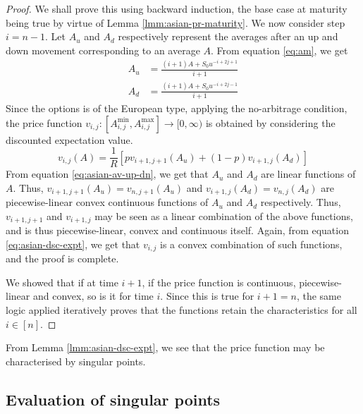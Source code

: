 \begin{proof}
	We shall prove this using backward induction, the base case at maturity being true by virtue of Lemma \ref{lmm:asian-pr-maturity}.
	We now consider step $ i = n-1 $. Let $A_u$ and $A_d$ respectively represent the averages after an up and down movement corresponding to an average $A$. From equation \ref{eq:am}, we get
	\begin{subequations}
		\label{eq:asian-av-up-dn}
		\begin{align}
			A_u &= \frac{ (i+1) A + S_0 u^{-i+2j+1} }{ i+1 } \\
			A_d &= \frac{ (i+1) A + S_0 u^{-i+2j-1} }{ i+1 }
		\end{align}
	\end{subequations}
	Since the options is of the European type, applying the no-arbitrage condition, the price function $ v_{i,j}: \left[ A_{i,j}^{\min}, A_{i,j}^{\max} \right] \to [0, \infty) $ is obtained by considering the discounted expectation value.
	\begin{equation}
		\label{eq:asian-dsc-expt}
		v_{i,j}(A) = \frac{1}{R} \left[ p v_{i+1,j+1}(A_u) + (1 - p) v_{i+1,j}(A_d) \right]
	\end{equation}
	From equation \ref{eq:asian-av-up-dn}, we get that $A_u$ and $A_d$ are linear functions of $A$. Thus, $ v_{i+1,j+1}(A_u) = v_{n,j+1}(A_u)$ and $ v_{i+1,j}(A_d) = v_{n,j}(A_d) $ are piecewise-linear convex continuous functions of $A_u$ and $A_d$ respectively. Thus, $ v_{i+1,j+1} $ and $ v_{i+1,j} $ may be seen as a linear combination of the above functions, and is thus piecewise-linear, convex and continuous itself. Again, from equation \ref{eq:asian-dsc-expt}, we get that $v_{i,j}$ is a convex combination of such functions, and the proof is complete.
	
	We showed that if at time $ i+1 $, if the price function is continuous, piecewise-linear and convex, so is it for time $ i $. Since this is true for $ i+1 = n $, the same logic applied iteratively proves that the functions retain the characteristics for all $ i \in [n] $.
\end{proof}


\begin{rem}
	From Lemma \ref{lmm:asian-dsc-expt}, we see that the price function may be characterised by singular points.
\end{rem}



\subsection{Evaluation of singular points}
\label{subsec:asian-eu-eval}

